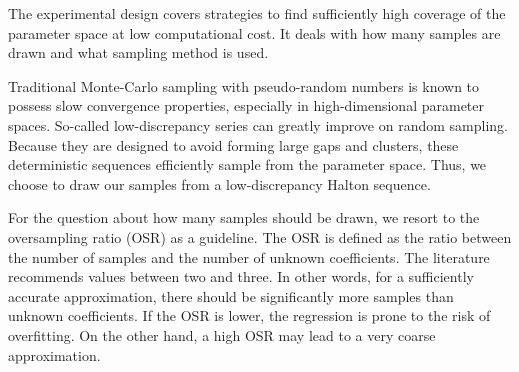 


The experimental design covers strategies to find sufficiently high coverage
of the parameter space at low computational cost.\cite{fajraoui_optimal_2017,usher_value_2015}
It deals with how many samples are drawn and what sampling method is used.


Traditional Monte-Carlo sampling with pseudo-random numbers is known to
possess slow convergence properties, %
especially in high-dimensional parameter spaces.
So-called low-discrepancy series can greatly improve on random sampling.
Because they are designed to avoid forming large gaps and clusters,
these deterministic sequences efficiently sample from the parameter space.\cite{fajraoui_optimal_2017}
Thus, we choose to draw our samples from a low-discrepancy Halton sequence.


For the question about how many samples should be drawn,
we resort to the oversampling ratio (OSR) as a guideline.
The OSR is defined as the ratio between the number of samples
and the number of unknown coefficients.\cite{palar_multi-fidelity_2016}
The literature recommends values between two and three.\cite{hosder2007,palar_multi-fidelity_2016,fajraoui_optimal_2017,gratiet_metamodel-based_2015}
In other words, for a sufficiently accurate approximation,
there should be significantly more samples than unknown coefficients.
If the OSR is lower, the regression is prone to the risk of overfitting.
On the other hand, a high OSR may lead to a very coarse approximation.\cite{palar_multi-fidelity_2016}

